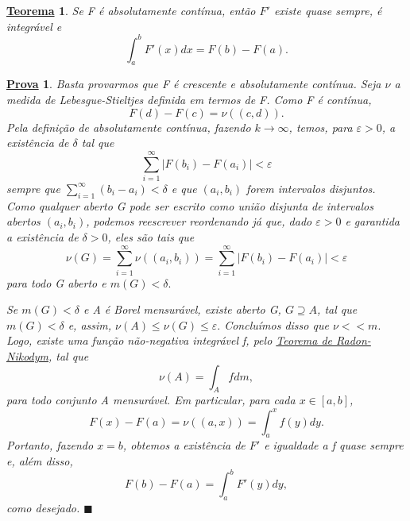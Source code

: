 \documentclass{article}
\newtheorem*{theorem*}{\underline{Teorema}}
\newtheorem*{proof*}{\underline{Prova}}
\renewcommand\qedsymbol{$\blacksquare$}
\begin{document}
\begin{theorem*}
  Se F é absolutamente contínua, então \(F'\) existe quase sempre, é integrável e 
    \[
      \int_{a}^{b}F'(x)dx = F(b) - F(a).
    \]
\end{theorem*}
 \begin{proof*}
   Basta provarmos que F é crescente e absolutamente contínua. Seja \(\nu \) a medida de Lebesgue-Stieltjes definida em termos de F. Como F é contínua,
     \[
       F(d) - F(c) = \nu ((c, d)).
     \]
    Pela definição de absolutamente contínua, fazendo \(k\to \infty\), temos, para \(\varepsilon > 0\), a existência de \(\delta \) tal que 
      \[
        \sum\limits_{i=1}^{\infty}|F(b_{i}) - F(a_{i})| < \varepsilon 
      \]
    sempre que \(\sum\limits_{i=1}^{\infty}(b_{i}-a_{i})<\delta \) e que \((a_{i}, b_{i})\) forem intervalos disjuntos. Como qualquer aberto G pode ser escrito como união disjunta de intervalos abertos \((a_{i}, b_{i})\), podemos reescrever reordenando já que, 
  dado \(\varepsilon > 0\) e garantida a existência de \(\delta > 0\), eles são tais que 
    \[
      \nu (G) = \sum\limits_{i=1}^{\infty}\nu ((a_{i}, b_{i})) = \sum\limits_{i=1}^{\infty}|F(b_{i}) - F(a_{i})| < \varepsilon 
    \]
  para todo G aberto e \(m(G) < \delta .\)

  Se \(m(G) < \delta \) e A é Borel mensurável, existe aberto G, \(G\supseteq A\), tal que \(m(G) < \delta \) e, assim, \(\nu (A) \leq \nu (G) \leq \varepsilon .\) Concluímos disso que \(\nu << m.\) 
Logo, existe uma função não-negativa integrável f, pelo \hyperlink{radon_nikodym}{Teorema de Radon-Nikodym}, tal que 
  \[
    \nu (A) = \int_{A}f dm,
  \]
  para todo conjunto A mensurável. Em particular, para cada \(x\in [a, b]\), 
    \[
      F(x) - F(a) = \nu ((a, x)) = \int_{a}^{x}f(y)dy.
    \]
    Portanto, fazendo \(x=b\), obtemos a existência de \(F'\) e igualdade a f quase sempre e, além disso, 
      \[
        F(b) - F(a) = \int_{a}^{b}F'(y)dy,
      \]
    como desejado. \qedsymbol
 \end{proof*}
 \newpage 
\end{document}

